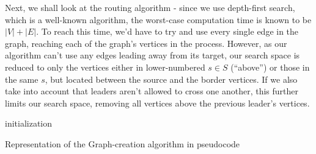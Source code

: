 \documentclass[11pt,a4paper]{vutinfth}
\begin{document}
Next, we shall look at the routing algorithm - since we use depth-first search, which is a well-known algorithm, the worst-case computation time is known to be $|V|+|E|$. To reach this time, we'd have to try and use every single edge in the graph, reaching each of the graph's vertices in the process. However, as our algorithm can't use any edges leading away from its target, our search space is reduced to only the vertices either in lower-numbered $s \in S$ (``above'') or those in the same $s$, but located between the source and the border vertices. If we also take into account that leaders aren't allowed to cross one another, this further limits our search space, removing all vertices above the previous leader's vertices.



\begin{algorithm}
\DontPrintSemicolon
{}
  



 initialization\;
 
\caption{Representation of the Graph-creation algorithm in pseudocode}
\label{alg:GraphCreation}
\end{algorithm}
\end{document}
